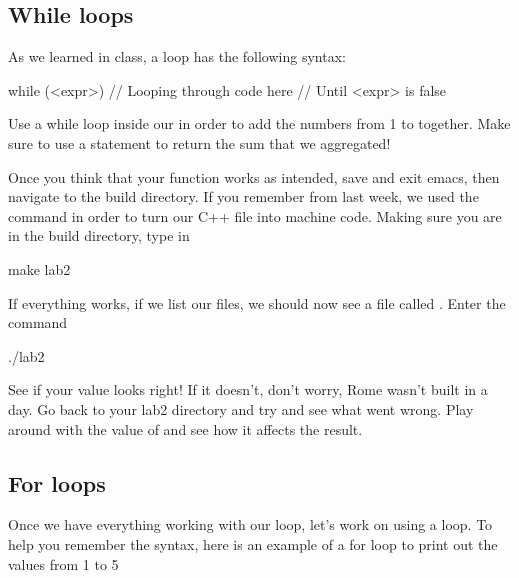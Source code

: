 \documentclass{tufte-handout}
\begin{document}
\subsection{While loops}
As we learned in class, a   loop has the following
syntax:

\begin{Code}
    while (<expr>) {
        // Looping through code here
        // Until <expr> is false
    }
\end{Code}


Use a while loop inside our  in order to add the numbers from 1 to  together.
Make sure to use a  statement to return the sum that we aggregated!

Once you think that your function works as intended, save and exit emacs, then navigate to the build directory. If you remember from last week, we used the  command in order to turn our C++ file into machine code.  Making sure you are in the build directory, type in 
\begin{CmdLine}
  \prompt make lab2
\end{CmdLine}
If everything works, if we list our files, we should now see a file called .  Enter the command
\begin{CmdLine}
  \prompt ./lab2
\end{CmdLine}
See if your value looks right!  If it doesn't, don't worry, Rome wasn't built in a day.  Go back to your lab2 directory and try and see what went wrong.  Play around with the value of  and see how it affects the result.

\subsection{For loops}


Once we have everything working with our  loop, let's work on using a  loop.  To help you remember the syntax, here is an example of a for loop to print out the values from 1 to 5
\end{document}
